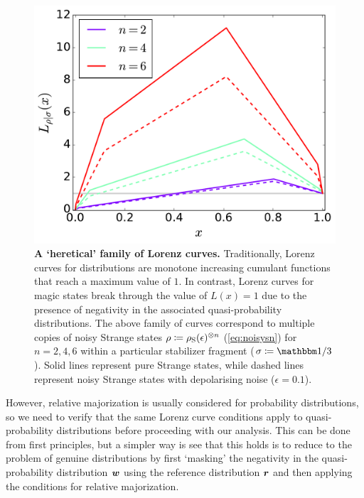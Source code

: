 \documentclass[pra,
aps,
twocolumn,
superscriptaddress,
groupedaddress,
nofootinbib,
reprint
]{revtex4-1}
\begin{document}
\begin{figure}
    \centering
    \includegraphics[scale=0.35]{figs/lc_strange.pdf}
    \caption{\textbf{A `heretical' family of Lorenz curves.} Traditionally, Lorenz curves for distributions are monotone increasing cumulant functions that reach a maximum value of $1$. In contrast, Lorenz curves for magic states break through the value of $L(x)=1$ due to the presence of negativity in the associated quasi-probability distributions. The above family of curves correspond to multiple copies of noisy Strange states $\rho\coloneqq\rho_{\rm{S}}(\epsilon)^{\otimes n}$ (\cref{eq:noisysn}) for $n=2,4,6$ within a particular stabilizer fragment ($\sigma \coloneqq \id/3$). Solid lines represent pure Strange states, while dashed lines represent noisy Strange states with depolarising noise ($\epsilon = 0.1$).
    }
    \label{fig:lcs}
\end{figure}

However, relative majorization is usually considered for probability distributions, so we need to verify that the same Lorenz curve conditions apply to quasi-probability distributions before proceeding with our analysis. This can be done from first principles, but a simpler way is see that this holds is to reduce to the problem of genuine distributions by first `masking' the negativity in the quasi-probability distribution $\boldsymbol{w}$ using the reference distribution $\boldsymbol{r}$ and then applying the conditions for relative majorization. 
 
\end{document}
